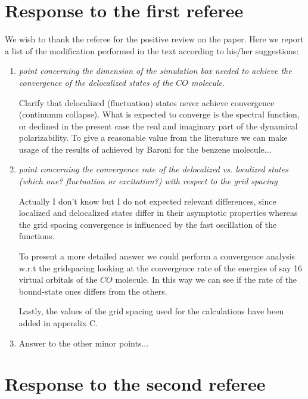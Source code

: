 \documentclass[11pt,a4paper]{article}
\begin{document}


\section*{Response to the first referee}

We wish to thank the referee for the positive review on the paper. Here we report a list of the modification performed in the text according
to his/her suggestions:
\begin{enumerate}
  \item \emph{point concerning the dimension of the simulation box needed to achieve the convergence of the delocalized states of the $CO$ molecule}. 
  
  Clarify that delocalized (fluctuation) states never achieve convergence (continumm collapse). What is expected to converge is the spectral function, or declined in the present case the real and imaginary part of the dynamical polarizability. To give a reasonable value from the literature we can make usage of the results of achieved by Baroni for the benzene molecule... 
  \item \emph{point concerning the convergence rate of the delocalized vs. localized states (which one? fluctuation or excitation?) with respect
  to the grid spacing}
  
 Actually I don't know but I do not expected relevant differences, since localized and delocalized states differ in their asymptotic properties whereas the grid spacing convergence is influenced by the fast oscillation of the functions.  
 
 To present a more detailed answer we could perform a convergence analysis w.r.t the gridspacing looking at the convergence rate of the energies of say 16 virtual orbitals of the $CO$ molecule. In this way we can see if the rate of the bound-state ones differs from the others.
 
 Lastly, the values of the grid spacing used for the calculations have been added in appendix C.
 
\item Answer to the other minor points...
  
\end{enumerate}

\section*{Response to the second referee}
\end{document}
